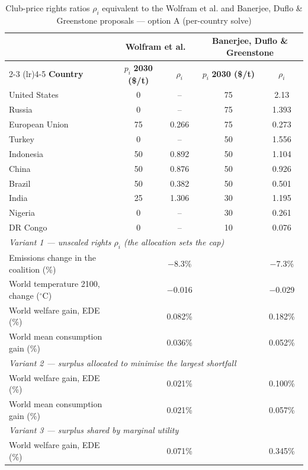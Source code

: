 \begin{table}[htbp]
\centering
\small
\caption{Club-price rights ratios $\rho_i$ equivalent to the Wolfram et al. and Banerjee, Duflo \& Greenstone proposals --- option A (per-country solve)}
\renewcommand{\arraystretch}{1.15}
\begin{tabular}{lcccc}
  \toprule
  & \multicolumn{2}{c}{\textbf{Wolfram et al.}} & \multicolumn{2}{c}{\textbf{Banerjee, Duflo \& Greenstone}} \\
  \cmidrule(lr){2-3} \cmidrule(lr){4-5}
  \textbf{Country} & $p_i$ \textbf{2030 (\$/t)} & $\rho_i$ & $p_i$ \textbf{2030 (\$/t)} & $\rho_i$ \\
  \midrule
  United States & 0 & -- & 75 & 2.13 \\
  Russia & 0 & -- & 75 & 1.393 \\
  European Union & 75 & 0.266 & 75 & 0.273 \\
  Turkey & 0 & -- & 50 & 1.556 \\
  Indonesia & 50 & 0.892 & 50 & 1.104 \\
  China & 50 & 0.876 & 50 & 0.926 \\
  Brazil & 50 & 0.382 & 50 & 0.501 \\
  India & 25 & 1.306 & 30 & 1.195 \\
  Nigeria & 0 & -- & 30 & 0.261 \\
  DR Congo & 0 & -- & 10 & 0.076 \\
  \midrule
  \multicolumn{5}{l}{\textit{Variant 1 --- unscaled rights $\rho_i$ (the allocation sets the cap)}} \\
  \quad Emissions change in the coalition (\%) &  & $-$8.3\% &  & $-$7.3\% \\
  \quad World temperature 2100, change ($^\circ$C) &  & $-$0.016 &  & $-$0.029 \\
  \quad World welfare gain, EDE (\%) &  & 0.082\% &  & 0.182\% \\
  \quad World mean consumption gain (\%) &  & 0.036\% &  & 0.052\% \\
  \midrule
  \multicolumn{5}{l}{\textit{Variant 2 --- surplus allocated to minimise the largest shortfall}} \\
  \quad World welfare gain, EDE (\%) &  & 0.021\% &  & 0.100\% \\
  \quad World mean consumption gain (\%) &  & 0.021\% &  & 0.057\% \\
  \midrule
  \multicolumn{5}{l}{\textit{Variant 3 --- surplus shared by marginal utility}} \\
  \quad World welfare gain, EDE (\%) &  & 0.071\% &  & 0.345\% \\

\end{tabular}
\end{table}
